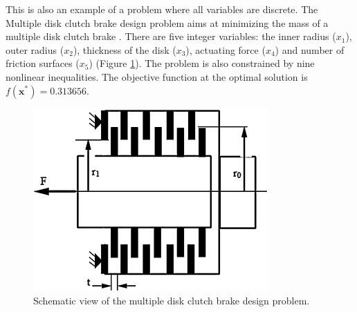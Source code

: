 

This is also an example of a problem where all variables are discrete. The Multiple disk clutch brake design problem aims at minimizing the mass of a multiple disk clutch brake \cite{MD}. There are five integer variables: the inner radius ($x_1$), outer radius ($x_2$), thickness of the disk ($x_3$), actuating force ($x_4$) and number of friction surfaces ($x_5$) (Figure \ref{fig:MD}). The problem is also constrained by nine nonlinear inequalities. The objective function at the optimal solution is $f(\bm{x}^*) = 0.313656$. %


%

\vspace{0.5cm}


\begin{figure}[h]
    \begin{center}
    \includegraphics[scale=0.5]{img/Problems/MD.jpg}
    \end{center}
    \captionsetup{justification=centering}
    \caption{Schematic view of the multiple disk clutch brake design problem.}\label{fig:MD}
\end{figure}